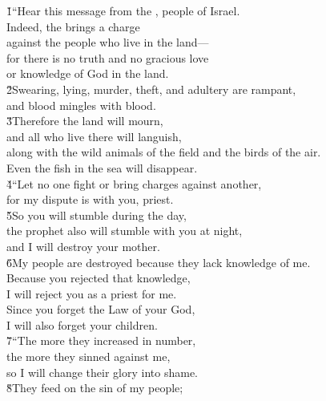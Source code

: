 \begin{poetry}
\poeml {}
\v{1}``Hear this message from the , people of Israel. \\
\poemll    Indeed, the  brings a charge \\
\poemll    against the people who live in the land--- \\
\poeml for there is no truth and no gracious love \\
\poemll    or knowledge of God in the land. \\
\poeml \v{2}Swearing, lying, murder, theft, and adultery are rampant, \\
\poemll    and blood mingles with blood. \\
\poeml \v{3}Therefore the land will mourn, \\
\poemll    and all who live there will languish, \\
\poeml along with the wild animals of the field and the birds of the air. \\
\poemll    Even the fish in the sea will disappear. \\
\poeml \v{4}``Let no one fight or bring charges against another, \\
\poemll    for my dispute is with you, priest. \\
\poeml \v{5}So you will stumble during the day, \\
\poemll    the prophet also will stumble with you at night, \\
\poemlll       and I will destroy your mother. \\
\poeml \v{6}My people are destroyed because they lack knowledge of me. \\
\poemll    Because you rejected that knowledge, \\
\poemlll       I will reject you as a priest for me. \\
\poeml Since you forget the Law of your God, \\
\poemll    I will also forget your children. \\
\poeml \v{7}``The more they increased in number, \\
\poemll    the more they sinned against me, \\
\poemlll       so I will change their glory into shame. \\
\poeml \v{8}They feed on the sin of my people; \\

\end{poetry}
